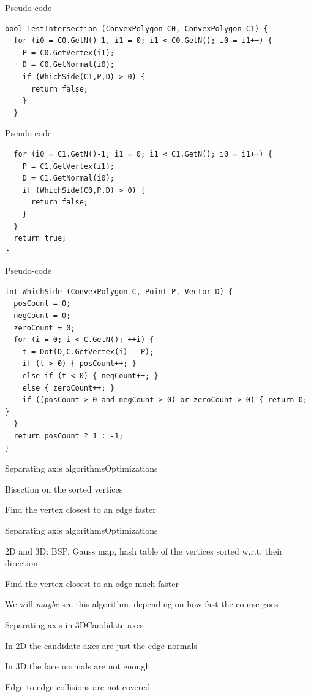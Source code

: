 \documentclass{beamer}
\begin{document}
\begin{frame}[fragile]{Pseudo-code}
\begin{lstlisting}
bool TestIntersection (ConvexPolygon C0, ConvexPolygon C1) { 
  for (i0 = C0.GetN()-1, i1 = 0; i1 < C0.GetN(); i0 = i1++) { 
    P = C0.GetVertex(i1);
    D = C0.GetNormal(i0); 
    if (WhichSide(C1,P,D) > 0) { 
      return false; 
    }
  }
\end{lstlisting}
\end{frame}
\begin{frame}[fragile]{Pseudo-code}
\begin{lstlisting}
  for (i0 = C1.GetN()-1, i1 = 0; i1 < C1.GetN(); i0 = i1++) { 
    P = C1.GetVertex(i1); 
    D = C1.GetNormal(i0); 
    if (WhichSide(C0,P,D) > 0) { 
      return false; 
    } 
  }
  return true;
}
\end{lstlisting}
\end{frame}
\begin{frame}[fragile]{Pseudo-code}
\begin{lstlisting}
int WhichSide (ConvexPolygon C, Point P, Vector D) { 
  posCount = 0; 
  negCount = 0; 
  zeroCount = 0; 
  for (i = 0; i < C.GetN(); ++i) { 
    t = Dot(D,C.GetVertex(i) - P); 
    if (t > 0) { posCount++; } 
    else if (t < 0) { negCount++; } 
    else { zeroCount++; }    
    if ((posCount > 0 and negCount > 0) or zeroCount > 0) { return 0; }
  } 
  return posCount ? 1 : -1;
}  
\end{lstlisting}
\end{frame}

\begin{slide}{Separating axis algorithms}{Optimizations}{
\item Bisection on the sorted vertices
\item Find the vertex closest to an edge faster
}\end{slide}

\begin{slide}{Separating axis algorithms}{Optimizations}{
\item 2D and 3D: BSP, Gauss map, hash table of the vertices sorted w.r.t. their direction
\item Find the vertex closest to an edge much faster
\item We will \textit{maybe} see this algorithm, depending on how fast the course goes
}\end{slide}

\begin{slide}{Separating axis in 3D}{Candidate axes}{
\item In 2D the candidate axes are just the edge normals
\item In 3D the face normals are not enough
\item Edge-to-edge collisions are not covered
}\end{slide}
\end{document}
